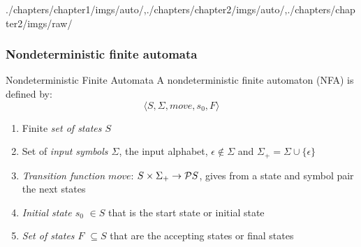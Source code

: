 \begin{graphicspathcontext}{{./chapters/chapter1/imgs/auto/},{./chapters/chapter2/imgs/auto/},{./chapters/chapter2/imgs/raw/}}
\begin{bibunit}[apalike]
\subsubsection{Nondeterministic finite automata}
\subsubsectiontableofcontentslide

\begin{frame}{Nondeterministic Finite Automata}
	A nondeterministic finite automaton (NFA) is defined by:
		\[\langle S, \Sigma, move, s_0, F\rangle\]
	\begin{enumerate}
	\item Finite \emph{set of states $S$}
	\vfill
	\item Set of \emph{input symbols $\Sigma$}, the input alphabet, $\epsilon \notin \Sigma$ and $\Sigma_+ = \Sigma \cup \{\epsilon\}$
	\vfill
	\item \emph{Transition function $move$}: $S \times \Sigma_+ \rightarrow \mathcal{P}{S}$, gives from a state and symbol pair the next states
	\vfill
	\item \emph{Initial state $s_0$} $\in S$ that is the start state or initial state
	\vfill
	\item \emph{Set of states $F$} $\subseteq S$ that are the accepting states or final states
	\end{enumerate}
\end{frame}


\end{bibunit}
\end{graphicspathcontext}
